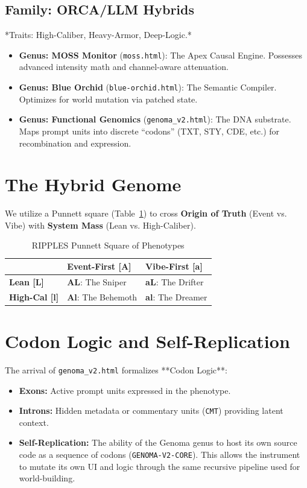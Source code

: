 \documentclass[11pt, a4paper, twocolumn]{article}
\begin{document}
\subsection{Family: ORCA/LLM Hybrids}
*Traits: High-Caliber, Heavy-Armor, Deep-Logic.*
\begin{itemize}
    \item \textbf{Genus: MOSS Monitor} (\texttt{moss.html}): The Apex Causal Engine. Possesses advanced intensity math and channel-aware attenuation.
    \item \textbf{Genus: Blue Orchid} (\texttt{blue-orchid.html}): The Semantic Compiler. Optimizes for world mutation via patched state.
    \item \textbf{Genus: Functional Genomics} (\texttt{genoma\_v2.html}): The DNA substrate. Maps prompt units into discrete ``codons'' (TXT, STY, CDE, etc.) for recombination and expression.
\end{itemize}

\section{The Hybrid Genome}
We utilize a Punnett square (Table~\ref{tab:hybrid}) to cross \textbf{Origin of Truth} (Event vs. Vibe) with \textbf{System Mass} (Lean vs. High-Caliber).

\begin{table}[htbp]
\centering
\caption{RIPPLES Punnett Square of Phenotypes}
\label{tab:hybrid}
\begin{tabular}{@{}lll@{}}
\toprule
& \textbf{Event-First [A]} & \textbf{Vibe-First [a]} \\ \midrule
\textbf{Lean [L]} & \textbf{AL}: The Sniper & \textbf{aL}: The Drifter \\
\textbf{High-Cal [l]} & \textbf{Al}: The Behemoth & \textbf{al}: The Dreamer \\ \bottomrule
\end{tabular}
\end{table}

\section{Codon Logic and Self-Replication}
The arrival of \texttt{genoma\_v2.html} formalizes **Codon Logic**:
\begin{itemize}
    \item \textbf{Exons:} Active prompt units expressed in the phenotype.
    \item \textbf{Introns:} Hidden metadata or commentary units (\texttt{CMT}) providing latent context.
    \item \textbf{Self-Replication:} The ability of the Genoma genus to host its own source code as a sequence of codons (\texttt{GENOMA-V2-CORE}). This allows the instrument to mutate its own UI and logic through the same recursive pipeline used for world-building.
\end{itemize}
\end{document}
